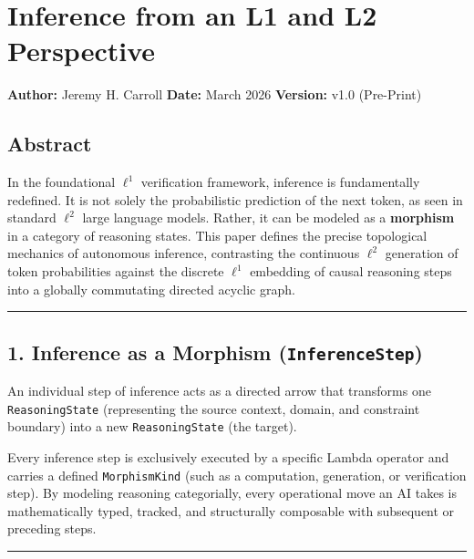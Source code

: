 \documentclass[
]{article}
\author{}
\date{}
\begin{document}
\section{Inference from an L1 and L2
Perspective}\label{inference-from-an-l1-and-l2-perspective}

\textbf{Author:} Jeremy H. Carroll \textbf{Date:} March 2026
\textbf{Version:} v1.0 (Pre-Print)

\subsection{Abstract}\label{abstract}

In the foundational \(\ell^1\) verification framework, inference is
fundamentally redefined. It is not solely the probabilistic prediction
of the next token, as seen in standard \(\ell^2\) large language models.
Rather, it can be modeled as a \textbf{morphism} in a category of
reasoning states. This paper defines the precise topological mechanics
of autonomous inference, contrasting the continuous \(\ell^2\)
generation of token probabilities against the discrete \(\ell^1\)
embedding of causal reasoning steps into a globally commutating directed
acyclic graph.

\begin{center}\rule{0.5\linewidth}{0.5pt}\end{center}

\subsection{\texorpdfstring{1. Inference as a Morphism
(\texttt{InferenceStep})}{1. Inference as a Morphism (InferenceStep)}}\label{inference-as-a-morphism-inferencestep}

An individual step of inference acts as a directed arrow that transforms
one \texttt{ReasoningState} (representing the source context, domain,
and constraint boundary) into a new \texttt{ReasoningState} (the
target).

Every inference step is exclusively executed by a specific Lambda
operator and carries a defined \texttt{MorphismKind} (such as a
computation, generation, or verification step). By modeling reasoning
categorially, every operational move an AI takes is mathematically
typed, tracked, and structurally composable with subsequent or preceding
steps.

\begin{center}\rule{0.5\linewidth}{0.5pt}\end{center}
\end{document}
